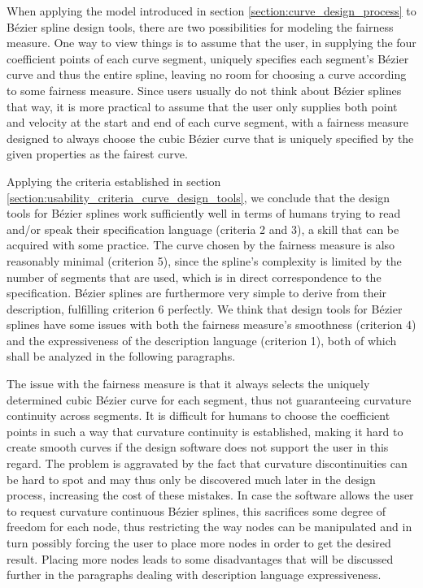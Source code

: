 \documentclass[a4paper]{article}
\begin{document}
				When applying the model introduced in section \ref{section:curve_design_process} to Bézier spline design tools, there are two possibilities for modeling the fairness measure. One way to view things is to assume that the user, in supplying the four coefficient points of each curve segment, uniquely specifies each segment's Bézier curve and thus the entire spline, leaving no room for choosing a curve according to some fairness measure. Since users usually do not think about Bézier splines that way, it is more practical to assume that the user only supplies both point and velocity at the start and end of each curve segment, with a fairness measure designed to always choose the cubic Bézier curve that is uniquely specified by the given properties as the fairest curve.

				Applying the criteria established in section \ref{section:usability_criteria_curve_design_tools}, we conclude that the design tools for Bézier splines work sufficiently well in terms of humans trying to read and/or speak their specification language (criteria 2 and 3), a skill that can be acquired with some practice. The curve chosen by the fairness measure is also reasonably minimal (criterion 5), since the spline's complexity is limited by the number of segments that are used, which is in direct correspondence to the specification. Bézier splines are furthermore very simple to derive from their description, fulfilling criterion 6 perfectly. We think that design tools for Bézier splines have some issues with both the fairness measure's smoothness (criterion 4) and the expressiveness of the description language (criterion 1), both of which shall be analyzed in the following paragraphs.

				The issue with the fairness measure is that it always selects the uniquely determined cubic Bézier curve for each segment, thus not guaranteeing curvature continuity across segments. It is difficult for humans to choose the coefficient points in such a way that curvature continuity is established, making it hard to create smooth curves if the design software does not support the user in this regard. The problem is aggravated by the fact that curvature discontinuities can be hard to spot and may thus only be discovered much later in the design process, increasing the cost of these mistakes. In case the software allows the user to request curvature continuous Bézier splines, this sacrifices some degree of freedom for each node, thus restricting the way nodes can be manipulated and in turn possibly forcing the user to place more nodes in order to get the desired result. Placing more nodes leads to some disadvantages that will be discussed further in the paragraphs dealing with description language expressiveness.
\end{document}
